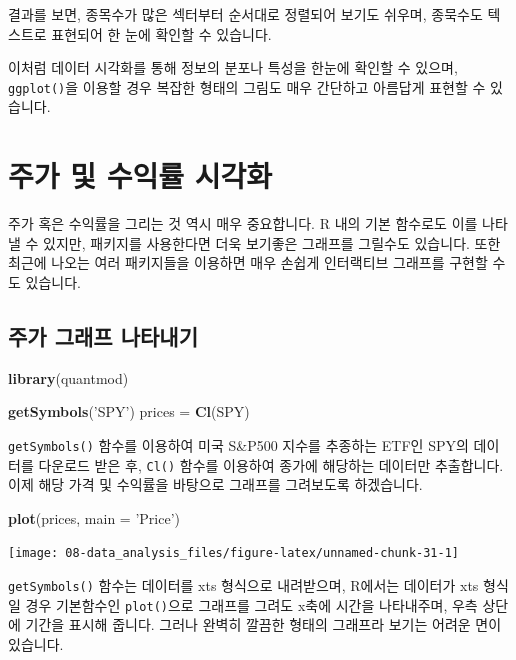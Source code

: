 \documentclass[12pt,]{book}
\newenvironment{Shaded}{\begin{snugshade}}{\end{snugshade}}
\newcommand{\DataTypeTok}[1]{\textcolor[rgb]{0.13,0.29,0.53}{#1}}
\newcommand{\KeywordTok}[1]{\textcolor[rgb]{0.13,0.29,0.53}{\textbf{#1}}}
\newcommand{\NormalTok}[1]{#1}
\newcommand{\StringTok}[1]{\textcolor[rgb]{0.31,0.60,0.02}{#1}}
\begin{document}
결과를 보면, 종목수가 많은 섹터부터 순서대로 정렬되어 보기도 쉬우며, 종묵수도 텍스트로 표현되어 한 눈에 확인할 수 있습니다.

이처럼 데이터 시각화를 통해 정보의 분포나 특성을 한눈에 확인할 수 있으며, \texttt{ggplot()}을 이용할 경우 복잡한 형태의 그림도 매우 간단하고 아름답게 표현할 수 있습니다.

\hypertarget{section-41}{%
\section{주가 및 수익률 시각화}\label{section-41}}

주가 혹은 수익률을 그리는 것 역시 매우 중요합니다. R 내의 기본 함수로도 이를 나타낼 수 있지만, 패키지를 사용한다면 더욱 보기좋은 그래프를 그릴수도 있습니다. 또한 최근에 나오는 여러 패키지들을 이용하면 매우 손쉽게 인터랙티브 그래프를 구현할 수도 있습니다.

\hypertarget{section-42}{%
\subsection{주가 그래프 나타내기}\label{section-42}}

\begin{Shaded}
\begin{Highlighting}[]
\KeywordTok{library}\NormalTok{(quantmod)}

\KeywordTok{getSymbols}\NormalTok{(}\StringTok{'SPY'}\NormalTok{)}
\NormalTok{prices =}\StringTok{ }\KeywordTok{Cl}\NormalTok{(SPY)}
\end{Highlighting}
\end{Shaded}

\texttt{getSymbols()} 함수를 이용하여 미국 S\&P500 지수를 추종하는 ETF인 SPY의 데이터를 다운로드 받은 후, \texttt{Cl()} 함수를 이용하여 종가에 해당하는 데이터만 추출합니다. 이제 해당 가격 및 수익률을 바탕으로 그래프를 그려보도록 하겠습니다.

\begin{Shaded}
\begin{Highlighting}[]
\KeywordTok{plot}\NormalTok{(prices, }\DataTypeTok{main =} \StringTok{'Price'}\NormalTok{)}
\end{Highlighting}
\end{Shaded}

\begin{center}\texttt{[image: 08-data\_analysis\_files/figure-latex/unnamed-chunk-31-1]} \end{center}

\texttt{getSymbols()} 함수는 데이터를 xts 형식으로 내려받으며, R에서는 데이터가 xts 형식일 경우 기본함수인 \texttt{plot()}으로 그래프를 그려도 x축에 시간을 나타내주며, 우측 상단에 기간을 표시해 줍니다. 그러나 완벽히 깔끔한 형태의 그래프라 보기는 어려운 면이 있습니다.
\end{document}
